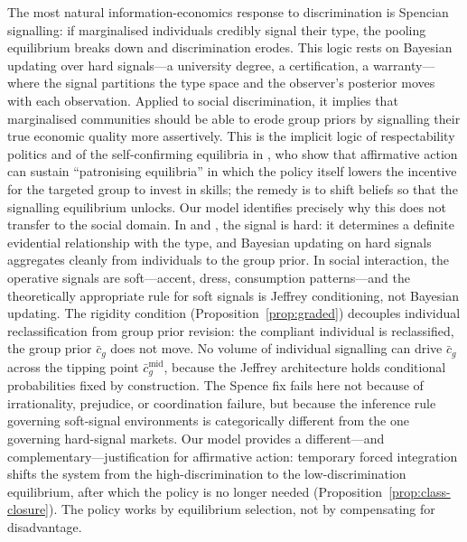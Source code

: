 \documentclass[12pt,a4paper]{article}
\theoremstyle{definition}
\numberwithin{proposition}{subsection}
\begin{document}
The most natural information-economics response to discrimination is
Spencian signalling: if marginalised individuals credibly signal
their type, the pooling equilibrium breaks down and discrimination
erodes. This logic rests on Bayesian updating over hard signals---a
university degree, a certification, a warranty---where the signal
partitions the type space and the observer's posterior moves with
each observation. Applied to social discrimination, it implies that
marginalised communities should be able to erode group priors by
signalling their true economic quality more assertively. This is the
implicit logic of respectability politics and of the self-confirming
equilibria in \citet{CoateLoury1993}, who show that affirmative
action can sustain ``patronising equilibria'' in which the policy
itself lowers the incentive for the targeted group to invest in
skills; the remedy is to shift beliefs so that the signalling
equilibrium unlocks. Our model identifies precisely why this does not
transfer to the social domain. In \citet{Akerlof1970} and
\citet{Spence1973}, the signal is hard: it determines a definite
evidential relationship with the type, and Bayesian updating on hard
signals aggregates cleanly from individuals to the group prior. In
social interaction, the operative signals are soft---accent, dress,
consumption patterns---and the theoretically appropriate rule for
soft signals is Jeffrey conditioning, not Bayesian updating. The
rigidity condition (Proposition~\ref{prop:graded}) decouples
individual reclassification from group prior revision: the compliant
individual is reclassified, the group prior $\bar{c}_g$ does not
move. No volume of individual signalling can drive $\bar{c}_g$
across the tipping point $\bar{c}_g^{\mathrm{mid}}$, because
the Jeffrey architecture holds conditional probabilities fixed by
construction. The Spence fix fails here not because of irrationality,
prejudice, or coordination failure, but because the inference rule
governing soft-signal environments is categorically different from
the one governing hard-signal markets. Our model provides a
different---and complementary---justification for affirmative action:
temporary forced integration shifts the system from the
high-discrimination to the low-discrimination equilibrium, after
which the policy is no longer needed
(Proposition~\ref{prop:class-closure}). The policy works by
equilibrium selection, not by compensating for disadvantage.
\end{document}
